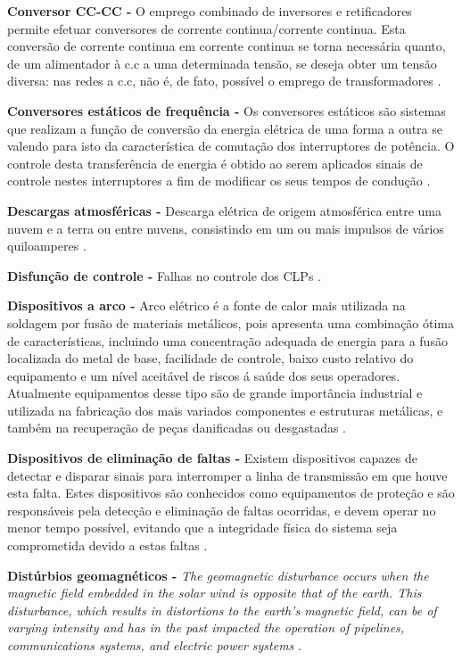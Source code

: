 \noindent
\textbf{Conversor CC-CC -} O emprego combinado de inversores e retificadores permite efetuar conversores de corrente continua/corrente continua. Esta conversão de corrente continua em corrente continua se torna necessária quanto, de um alimentador à c.c a uma determinada tensão, se deseja obter um tensão diversa: nas redes a c.c, não é, de fato, possível o emprego de transformadores \cite{FIN02}.

\noindent
\textbf{Conversores estáticos de frequência -} Os conversores estáticos são sistemas que realizam a função de conversão da energia elétrica de uma forma a outra se valendo para isto da característica de comutação dos interruptores de potência. O controle desta transferência de energia é obtido ao serem aplicados sinais de controle nestes interruptores a fim de modificar os seus tempos de condução \cite{ROE02}.

\noindent
\textbf{Descargas atmosféricas -} Descarga elétrica de origem atmosférica entre uma nuvem e a terra ou entre nuvens, consistindo em um ou mais impulsos de vários quiloamperes \cite{NBR54}.

\noindent
\textbf{Disfunção de controle -} Falhas no controle dos CLPs \cite{GAR82}.

\noindent
\textbf{Dispositivos a arco -} Arco elétrico é a fonte de calor mais utilizada na soldagem por fusão de materiais metálicos, pois apresenta uma combinação ótima de características, incluindo uma concentração adequada de energia para a fusão localizada do metal de base, facilidade de controle, baixo custo relativo do equipamento e um nível aceitável de riscos á saúde dos seus operadores. Atualmente equipamentos desse tipo são de grande importância industrial e utilizada na fabricação dos mais variados componentes e estruturas metálicas, e também na recuperação de peças danificadas ou desgastadas \cite{MOD09}.

\noindent
\textbf{Dispositivos de eliminação de faltas -} Existem dispositivos capazes de detectar e disparar sinais para interromper a linha de transmissão em que houve esta falta. Estes dispositivos são conhecidos como equipamentos de proteção e são responsáveis pela detecção e eliminação de faltas ocorridas, e devem operar no menor tempo possível, evitando que a integridade física do sistema seja comprometida devido a estas faltas \cite{SOU08}.

\noindent
\textbf{Distúrbios geomagnéticos -} \textit{The geomagnetic disturbance occurs when the magnetic field embedded in the solar  wind  is opposite  that  of  the  earth.  This  disturbance,  which  results in distortions  to  the  earth’s magnetic field,  can be of varying  intensity and has in the past impacted the operation of pipelines, communications systems, and electric power  systems} \cite{BAR91}.

